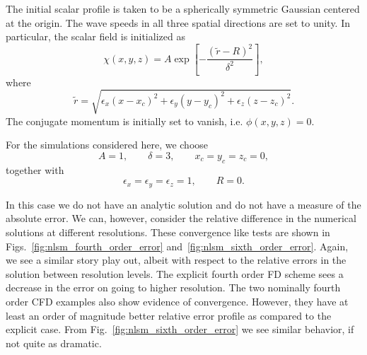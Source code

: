 The initial scalar profile is taken to be a spherically symmetric Gaussian centered
at the origin. The wave speeds in all three spatial directions are set to unity.
In particular, the scalar field is initialized as
\begin{equation}
\chi(x,y,z)
=
A
\exp\left[
-\frac{(\tilde r-R)^2}{\delta^2}
\right],
\end{equation}
where
\begin{equation}
\tilde r
=
\sqrt{
\epsilon_x(x-x_c)^2
+
\epsilon_y(y-y_c)^2
+
\epsilon_z(z-z_c)^2
}.
\end{equation}
The conjugate momentum is initially set to vanish, i.e. $\phi(x,y,z)=0$.

For the simulations considered here, we choose
\begin{equation}
A=1,\qquad
\delta=3,\qquad
x_c=y_c=z_c=0,
\end{equation}
together with
\begin{equation}
\epsilon_x=\epsilon_y=\epsilon_z=1,
\qquad
R=0.
\end{equation}

In this case we do not have an analytic solution and do not have a measure of the absolute error.  We can, however, consider the relative difference in the numerical solutions at different resolutions.  These convergence like tests are shown in Figs.~\ref{fig:nlsm_fourth_order_error} and~\ref{fig:nlsm_sixth_order_error}. Again, we see a similar story play out, albeit with respect to the relative errors in the solution between resolution levels.  The explicit fourth order FD scheme sees a decrease in the error on going to higher resolution.  The two nominally fourth order CFD examples also show evidence of convergence. However, they have at least an order of magnitude better relative error profile as compared to the explicit case.  From Fig.~\ref{fig:nlsm_sixth_order_error} we see similar behavior, if not quite as dramatic.  
 


